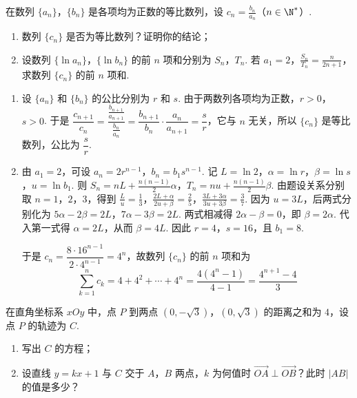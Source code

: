 \begin{problem}
在数列 \(\{a_{n}\}\)，\(\{b_{n}\}\) 是各项均为正数的等比数列，设 \(c_{n} = \frac{b_{n}}{a_{n}}\)（\(n \in \N^{*}\)）.

\begin{enumerate}
\item 数列 \(\{c_{n}\}\) 是否为等比数列？证明你的结论；
\item 设数列 \(\{\ln a_n\}\)，\(\{\ln b_n\}\) 的前 \(n\) 项和分别为 \(S_n\)，\(T_n\). 若 \(a_1 = 2\)，\(\frac{S_n}{T_n} = \frac{n}{2n + 1}\)，求数列 \(\{c_n\}\) 的前 \(n\) 项和.
\end{enumerate}
\end{problem}

\begin{solution}
\begin{enumerate}
\item 设 \(\{a_n\}\) 和 \(\{b_n\}\) 的公比分别为 \(r\) 和 \(s\). 由于两数列各项均为正数，\(r>0\)，\(s>0\). 于是
\(\dfrac{c_{n+1}}{c_n}=\dfrac{\frac{b_{n+1}}{a_{n+1}}}{\frac{b_n}{a_n}}=\dfrac{b_{n+1}}{b_n}\cdot\dfrac{a_n}{a_{n+1}}=\dfrac{s}{r}\)，它与 \(n\) 无关，所以 \(\{c_n\}\) 是等比数列，公比为 \(\dfrac{s}{r}\).

\item 由 \(a_1=2\)，可设 \(a_n=2r^{n-1}\)，\(b_n=b_1s^{n-1}\). 记 \(L=\ln2\)，\(\alpha=\ln r\)，\(\beta=\ln s\)，\(u=\ln b_1\). 则
\(S_n=nL+\frac{n(n-1)}{2}\alpha\)，\(T_n=nu+\frac{n(n-1)}{2}\beta\).
由题设关系分别取 \(n=1\)，\(2\)，\(3\)，得到
\(\frac{L}{u}=\frac{1}{3}\)，\(\frac{2L+\alpha}{2u+\beta}=\frac{2}{5}\)，\(\frac{3L+3\alpha}{3u+3\beta}=\frac{3}{7}\).
因为 \(u=3L\)，后两式分别化为
\(5\alpha-2\beta=2L\)，\(7\alpha-3\beta=2L\).
两式相减得 \(2\alpha-\beta=0\)，即 \(\beta=2\alpha\). 代入第一式得 \(\alpha=2L\)，从而 \(\beta=4L\). 因此 \(r=4\)，\(s=16\)，且 \(b_1=8\).

于是 \(c_n=\dfrac{8\cdot16^{n-1}}{2\cdot4^{n-1}}=4^n\)，故数列 \(\{c_n\}\) 的前 \(n\) 项和为
\[
\sum_{k=1}^{n}c_k=4+4^2+\cdots+4^n=\frac{4(4^n-1)}{4-1}=\frac{4^{n+1}-4}{3}
\]
\end{enumerate}
\end{solution}

\begin{problem}
在直角坐标系 \(xOy\) 中，点 \(P\) 到两点 \((0, -\sqrt{3})\)，\((0, \sqrt{3})\) 的距离之和为 \(4\)，设点 \(P\) 的轨迹为 \(C\).

\begin{enumerate}
\item 写出 \(C\) 的方程；
\item 设直线 \( y = kx + 1 \) 与 \(C\) 交于 \(A\)，\(B\) 两点，\( k \) 为何值时 \( \overrightarrow{OA} \perp \overrightarrow{OB}\)？此时 \( \lvert AB\rvert \) 的值是多少？
\end{enumerate}
\end{problem}

